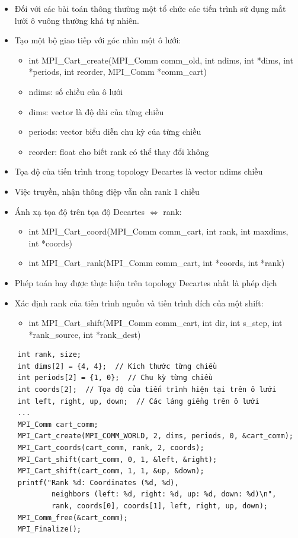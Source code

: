 \documentclass[14pt, a4paper]{article}
\numberwithin{equation}{section}
\numberwithin{figure}{section}
\numberwithin{dl}{section}
\numberwithin{md}{section}
\numberwithin{bd}{section}
\numberwithin{dn}{section}
\numberwithin{hq}{section}
\begin{document}
\begin{itemize}
    \item Đối với các bài toán thông thường một tổ chức các tiến trình sử dụng mắt lưới ô vuông thường khá tự nhiên.
    \item Tạo một bộ giao tiếp với góc nhìn một ô lưới:
    \begin{itemize}
        \item int MPI\_Cart\_create(MPI\_Comm comm\_old, int ndims,
                                  int *dims, int *periods, int reorder,
                                  MPI\_Comm *comm\_cart)
        \item ndims: số chiều của ô lưới
        \item dims: vector là độ dài của từng chiều
        \item periods: vector biểu diễn chu kỳ của từng chiều
        \item reorder: float cho biết rank có thể thay đổi không
    \end{itemize}
    \item Tọa độ của tiến trình trong topology Decartes là vector ndims chiều
    \item Việc truyền, nhận thông điệp vẫn cần rank 1 chiều
        \item Ánh xạ tọa độ trên tọa độ Decartes $\Leftrightarrow$ rank:
        \begin{itemize}
            \item int MPI\_Cart\_coord(MPI\_Comm comm\_cart, int rank, int maxdims,
                                      int *coords) 
            \item int MPI\_Cart\_rank(MPI\_Comm comm\_cart, int *coords, int *rank) 
        \end{itemize}
        \item Phép toán hay được thực hiện trên topology Decartes nhất là phép dịch
        \item Xác định rank của tiến trình nguồn và tiến trình đích của một shift:
        \begin{itemize}
            \item int MPI\_Cart\_shift(MPI\_Comm comm\_cart, int dir, int s\_step,
                                       int *rank\_source, int *rank\_dest)
        \end{itemize}
\end{itemize}

\begin{verbatim}
    int rank, size;
    int dims[2] = {4, 4};  // Kích thước từng chiều
    int periods[2] = {1, 0};  // Chu kỳ từng chiều
    int coords[2];  // Tọa độ của tiến trình hiện tại trên ô lưới
    int left, right, up, down;  // Các láng giềng trên ô lưới
    ...
    MPI_Comm cart_comm;
    MPI_Cart_create(MPI_COMM_WORLD, 2, dims, periods, 0, &cart_comm);
    MPI_Cart_coords(cart_comm, rank, 2, coords);
    MPI_Cart_shift(cart_comm, 0, 1, &left, &right);
    MPI_Cart_shift(cart_comm, 1, 1, &up, &down); 
    printf("Rank %d: Coordinates (%d, %d), 
            neighbors (left: %d, right: %d, up: %d, down: %d)\n",
            rank, coords[0], coords[1], left, right, up, down); 
    MPI_Comm_free(&cart_comm);
    MPI_Finalize();
        \end{verbatim}
\end{document}
